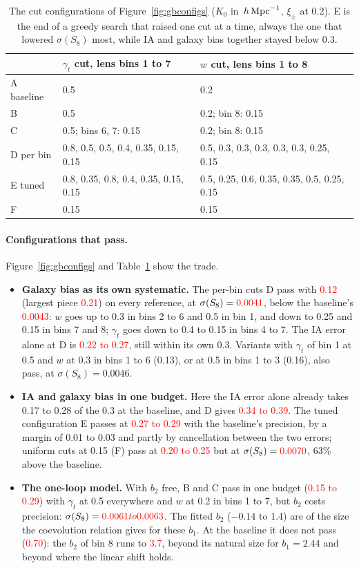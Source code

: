 \documentclass[11pt]{article}
\newcommand{\hMpc}{\,h\,{\rm Mpc}^{-1}}
\newif\ifnumbersfinal
\newcommand{\refresh}[1]{\ifnumbersfinal#1\else\textcolor{red}{#1}\fi}
\newcommand{\GBD}{\refresh{0.12}}            %
\newcommand{\GBDpiece}{\refresh{0.21}}
\newcommand{\GBDia}{\refresh{0.22 to 0.27}}
\newcommand{\GBDtot}{\refresh{0.34 to 0.39}}
\newcommand{\GBDsig}{\refresh{0.0041}}
\newcommand{\GBbaseSig}{\refresh{0.0043}}
\newcommand{\GBEtot}{\refresh{0.27 to 0.29}}
\newcommand{\GBFtot}{\refresh{0.20 to 0.25}}
\newcommand{\GBFsig}{\refresh{0.0070}}
\newcommand{\GBolBase}{\refresh{0.70}}       %
\newcommand{\GBolBtot}{\refresh{0.15 to 0.29}} %
\newcommand{\GBolSig}{\refresh{0.0061 to 0.0063}}
\newcommand{\GBolBEight}{\refresh{3.7}}      %
\newcommand{\Tol}{0.3}
\begin{document}
\begin{table}[tbp]
\centering
\small
\begin{tabular}{lll}
\toprule
 & $\gamma_t$ cut, lens bins 1 to 7 & $w$ cut, lens bins 1 to 8 \\
\midrule
A baseline & 0.5 & 0.2 \\
B & 0.5 & 0.2; bin 8: 0.15 \\
C & 0.5; bins 6, 7: 0.15 & 0.2; bin 8: 0.15 \\
D per bin & 0.8, 0.5, 0.5, 0.4, 0.35, 0.15, 0.15 & 0.5, 0.3, 0.3, 0.3, 0.3, 0.3, 0.25, 0.15 \\
E tuned & 0.8, 0.35, 0.8, 0.4, 0.35, 0.15, 0.15 & 0.5, 0.25, 0.6, 0.35, 0.35, 0.5, 0.25, 0.15 \\
F & 0.15 & 0.15 \\
\bottomrule
\end{tabular}
\caption{The cut configurations of Figure~\ref{fig:gbconfigs} ($K_0$ in
$\hMpc$, $\xi_\pm$ at 0.2). E is the end of a greedy search that raised one
cut at a time, always the one that lowered $\sigma(S_8)$ most, while IA and
galaxy bias together stayed below \Tol.}
\label{tab:gbconfigs}
\end{table}

\paragraph{Configurations that pass.}
Figure~\ref{fig:gbconfigs} and Table~\ref{tab:gbconfigs} show the trade.
\begin{itemize}
  \item \textbf{Galaxy bias as its own systematic.} The per-bin cuts D pass
    with \GBD{} (largest piece \GBDpiece) on every reference, at
    $\sigma(S_8) = \GBDsig$, below the baseline's \GBbaseSig: $w$ goes up to
    0.3 in bins 2 to 6 and 0.5 in bin 1, and down to 0.25 and 0.15 in bins
    7 and 8; $\gamma_t$ goes down to 0.4 to 0.15 in bins 4 to 7. The IA
    error alone at D is \GBDia, still within its own \Tol. Variants with $\gamma_t$ of bin 1 at 0.5 and $w$ at 0.3
    in bins 1 to 6 (0.13), or at 0.5 in bins 1 to 3 (0.16), also pass, at
    $\sigma(S_8) = 0.0046$.
  \item \textbf{IA and galaxy bias in one budget.} Here the IA error alone
    already takes 0.17 to 0.28 of the \Tol{} at the baseline, and D gives
    \GBDtot. The tuned
    configuration E passes at \GBEtot{} with the baseline's precision, by a
    margin of 0.01 to 0.03 and partly by cancellation between the two
    errors; uniform cuts at 0.15 (F) pass at \GBFtot{} but at
    $\sigma(S_8) = \GBFsig$, 63\% above the baseline.
  \item \textbf{The one-loop model.} With $b_2$ free, B and C pass in one
    budget (\GBolBtot) with $\gamma_t$ at 0.5 everywhere and $w$ at 0.2 in
    bins 1 to 7, but $b_2$ costs precision: $\sigma(S_8) = \GBolSig$. The
    fitted $b_2$ ($-0.14$ to 1.4) are of the size the coevolution relation
    gives for these $b_1$. At the baseline it does not pass (\GBolBase): the
    $b_2$ of bin 8 runs to \GBolBEight, beyond its natural size for
    $b_1 = 2.44$ and beyond where the linear shift holds.
\end{itemize}
\end{document}
